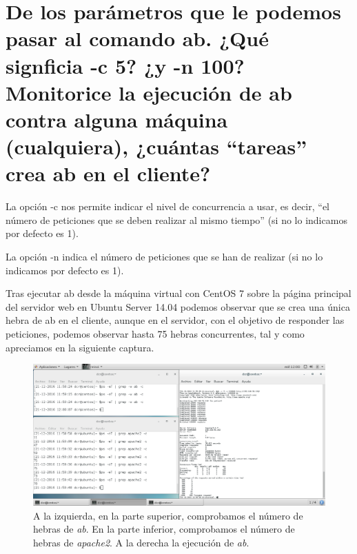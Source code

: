 \section{De los parámetros que le podemos pasar al comando ab. ¿Qué signficia -c 5? ¿y -n 100? Monitorice la ejecución de ab contra alguna máquina (cualquiera), ¿cuántas ``tareas'' crea ab en el cliente?}

La opción -c \cite{c2} nos permite indicar el nivel de concurrencia a usar, es decir, ``el número de peticiones que se deben realizar al mismo tiempo'' (si no lo indicamos por defecto es 1). \linebreak

La opción -n indica el número de peticiones que se han de realizar (si no lo indicamos por defecto es 1).

Tras ejecutar ab desde la máquina virtual con CentOS 7 sobre la página principal del servidor web en Ubuntu Server 14.04 podemos observar que se crea una única hebra de ab en el cliente, aunque en el servidor, con el objetivo de responder las peticiones, podemos observar hasta 75 hebras concurrentes, tal y como apreciamos en la siguiente captura.

\begin{figure}[H]
	\centering
	\includegraphics[scale=0.4]{ejer2.png}
	\caption{A la izquierda, en la parte superior, comprobamos el número de hebras de \textit{ab}. En la parte inferior, comprobamos el número de hebras de \textit{apache2}. A la derecha la ejecución de \textit{ab}.}
\end{figure}

